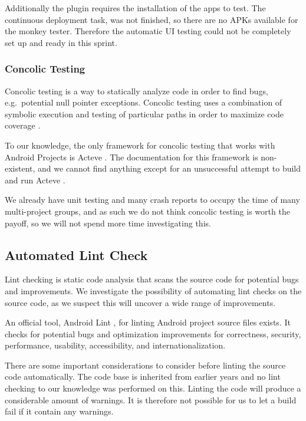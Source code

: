Additionally the plugin requires the installation of the apps to test. The continuous deployment task, was not finished, so there are no APKs available for the monkey tester. Therefore the automatic UI testing could not be completely set up and ready in this sprint.

\subsubsection{Concolic Testing}
Concolic testing is a way to statically analyze code in order to find bugs, e.g.\ potential null pointer exceptions. Concolic testing uses a combination of symbolic execution and testing of particular paths in order to maximize code coverage \parencite{concolic_testing_2015}.

To our knowledge, the only framework for concolic testing that works with Android Projects is Acteve \parencite{AnandNHY12, AnandH11}. The documentation for this framework is non-existent, and we cannot find anything except for an unsuccessful attempt to build and run Acteve \parencite{chenxiong-acteve}.

We already have unit testing and many crash reports to occupy the time of many multi-project groups, and as such we do not think concolic testing is worth the payoff, so we will not spend more time investigating this.

\subsection{Automated Lint Check}\label{sec:automated_lint}
Lint checking is static code analysis that scans the source code for potential bugs and improvements. We investigate the possibility of automating lint checks on the source code, as we suspect this will uncover a wide range of improvements.

An official tool, Android Lint \parencite{AndroidLint}, for linting Android project source files exists. It checks for potential bugs and optimization improvements for correctness, security, performance, usability, accessibility, and internationalization.

There are some important considerations to consider before linting the source code automatically. The code base is inherited from earlier years and no lint checking to our knowledge was performed on this. Linting the code will produce a considerable amount of warnings. It is therefore not possible for us to let a build fail if it contain any warnings.

